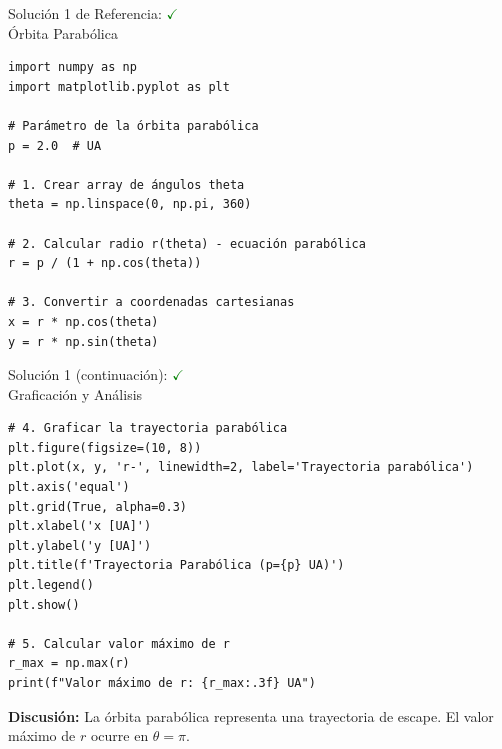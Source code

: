 \documentclass[10pt]{beamer}
\begin{document}
\begin{solutionblock}
\begin{frame}[fragile]{Solución 1 de Referencia: \hfill \textcolor{green}{$\checkmark$} \\ Órbita Parabólica}
\begin{Verbatim}[fontsize=\tiny]
import numpy as np
import matplotlib.pyplot as plt

# Parámetro de la órbita parabólica
p = 2.0  # UA

# 1. Crear array de ángulos theta
theta = np.linspace(0, np.pi, 360)

# 2. Calcular radio r(theta) - ecuación parabólica
r = p / (1 + np.cos(theta))

# 3. Convertir a coordenadas cartesianas
x = r * np.cos(theta)
y = r * np.sin(theta)
\end{Verbatim}
\end{frame}
\end{solutionblock}

\begin{solutionblock}
\begin{frame}[fragile]{Solución 1 (continuación): \hfill \textcolor{green}{$\checkmark$} \\ Graficación y Análisis}
\begin{Verbatim}[fontsize=\tiny]
# 4. Graficar la trayectoria parabólica
plt.figure(figsize=(10, 8))
plt.plot(x, y, 'r-', linewidth=2, label='Trayectoria parabólica')
plt.axis('equal')
plt.grid(True, alpha=0.3)
plt.xlabel('x [UA]')
plt.ylabel('y [UA]')
plt.title(f'Trayectoria Parabólica (p={p} UA)')
plt.legend()
plt.show()

# 5. Calcular valor máximo de r
r_max = np.max(r)
print(f"Valor máximo de r: {r_max:.3f} UA")
\end{Verbatim}
\textbf{Discusión:} La órbita parabólica representa una trayectoria de escape. El valor máximo de \(r\) ocurre en \(\theta = \pi\).
\end{frame}
\end{solutionblock}
\end{document}
